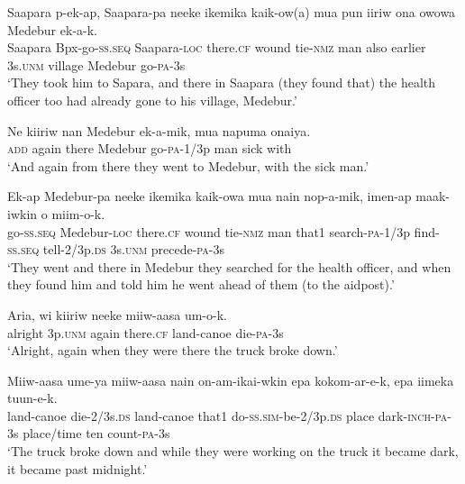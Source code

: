 {\ea\label{ex:a:x27}
\gll  Saapara  p-ek-ap,  Saapara-pa  neeke  ikemika  kaik-ow(a) mua  pun  iiriw  ona  owowa  Medebur  ek-a-k. \\
Saapara  Bpx-go-\textsc{ss.seq}  Saapara-\textsc{loc}  there.\textsc{cf}  wound  tie-\textsc{nmz}   man  also  earlier  3s.\textsc{unm}  village  Medebur  go-\textsc{pa}-3s \\


\glt ‘They took him to Sapara, and there in Saapara (they found that) the health officer too had already gone to his village, Medebur.’ \\
\z


\ea\label{ex:a:x28}
\gll  Ne  kiiriw  nan  Medebur  ek-a-mik,  mua  napuma  onaiya. \\
\textsc{add}  again  there  Medebur  go-\textsc{pa}-1/3p  man  sick  with \\
\glt ‘And again from there they went to Medebur, with the sick man.’ \\
\z


\ea\label{ex:a:x29}
\gll  Ek-ap  Medebur-pa  neeke  ikemika  kaik-owa  mua  nain  nop-a-mik,  imen-ap  maak-iwkin  o  miim-o-k. \\
go-\textsc{ss.seq}  Medebur-\textsc{loc}  there.\textsc{cf}  wound  tie-\textsc{nmz}  man  that1  search-\textsc{pa}-1/3p  find-\textsc{ss.seq}  tell-2/3p.\textsc{ds}  3s.\textsc{unm}  precede-\textsc{pa}-3s \\


\glt ‘They went and there in Medebur they searched for the health officer, and when they found him and told him he went ahead of them (to the aidpost).’ \\
\z


\ea\label{ex:a:x30}
\gll  Aria,  wi  kiiriw  neeke  miiw-aasa  um-o-k. \\
alright  3p.\textsc{unm}  again  there.\textsc{cf}  land-canoe  die-\textsc{pa}-3s \\
\glt ‘Alright, again when they were there the truck broke down.’ \\
\z


\ea\label{ex:a:x31}
\gll  Miiw-aasa  ume-ya  miiw-aasa  nain  on-am-ikai-wkin         epa  kokom-ar-e-k,  epa  iimeka  tuun-e-k. \\
land-canoe  die-2/3s.\textsc{ds}  land-canoe  that1  do-\textsc{ss}.\textsc{sim}-be-2/3p.\textsc{ds}  place  dark-\textsc{inch}-\textsc{pa}-3s  place/time  ten  count-\textsc{pa}-3s \\


\glt ‘The truck broke down and while they were working on the truck it became dark, it became past midnight.’ \\
\z


}
